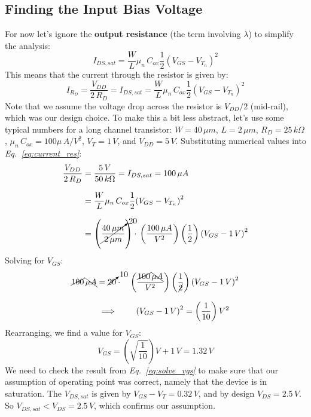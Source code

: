\subsection{Finding the Input Bias Voltage}
For now let's ignore the \textbf{output resistance} (the term involving $\lambda$) to simplify the analysis:
    \begin{equation}
        I_{DS,sat} = \frac{W}{L}\mu_n\,C_{ox}\frac{1}{2}{(V_{GS} - V_{T_n})^2}
    \end{equation}
This means that the current through the resistor is given by:
    \begin{equation}
        I_{R_D} = \frac{V_{DD}}{2\,{R_D}} = I_{DS,sat} = \frac{W}{L}\mu_n\,C_{ox}\frac{1}{2}{(V_{GS} - V_{T_n})}^2
        \label{eq:current_res}
    \end{equation}
Note that we assume the voltage drop across the resistor is $V_{DD}/2$ (mid-rail), which was our design choice.  To make this a bit less abstract, let's use some typical numbers for a long channel transistor: $W=40\,\mu m$, $L = 2\,\mu m$,  $R_D = 25\,k\Omega$, $\mu_n\,C_{ox} = 100\mu\,A/V^2$, $V_T = 1\,V$, and $V_{DD} = 5\,V$.  Substituting numerical values into \emph{Eq.~\ref{eq:current_res}}:
    \begin{align*}
        \frac{V_{DD}}{2\,{R_D}} &= \frac{5\,V}{50\,k\Omega} = I_{DS,sat} = 100\,\mu A\\[0.25cm]
        &= \frac{W}{L}\mu_n\,C_{ox}\frac{1}{2}{(V_{GS} - V_{T_n})}^2\\[0.25cm]
        &= \left( \cancelto{20}{\frac{40\,\mu m}{2\,\mu m}} \right) \cdot \,\left( \frac{100\,\mu A}{V^2} \right)
                \left( \frac{1}{2} \right) {(V_{GS} - 1\,V)}^2
    \end{align*}
Solving for $V_{GS}$:
    \begin{align*}
        \cancel{100}\,\bcancel{\mu A} &= \cancelto{10}{20} \cdot \quad \left( \frac{\cancel{100}\,\bcancel{\mu A}}{V^2} \right)
                \left( \frac{1}{\cancel{2}} \right) {(V_{GS} - 1\,V)}^2\\[0.25cm]
                &\implies \qquad {(V_{GS} - 1\,V)}^2 = \left( \frac{1}{10} \right) V^2
    \end{align*}
Rearranging, we find a value for $V_{GS}$:
    \begin{equation}
        V_{GS} = \left( \sqrt{\frac{1}{10}} \right) V + 1\,V = \boxed{1.32\,V}
        \label{eq:solve_vgs}
    \end{equation}
We need to check the result from \emph{Eq.~\ref{eq:solve_vgs}} to make sure that our assumption of operating point was correct, namely that the device is in saturation.  The $V_{DS,sat}$ is given by $V_{GS} - V_T = 0.32\,V$, and by design $V_{DS} = 2.5\,V$.  So $V_{DS,sat} < V_{DS} = 2.5\,V$, which confirms our assumption.
